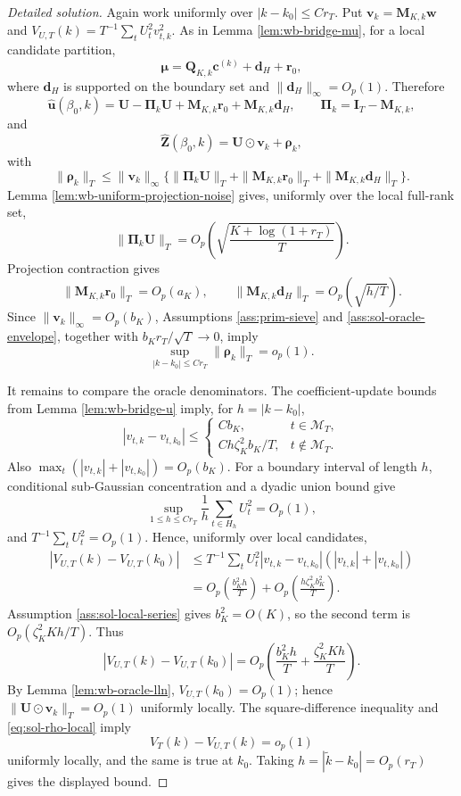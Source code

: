 \documentclass[12pt]{article}
\numberwithin{equation}{section}
\theoremstyle{definition}
\begin{document}
\begin{proof}[Detailed solution]
Again work uniformly over \(|k-k_0|\leq Cr_T\).  Put
\(\bm v_k=\bm M_{K,k}\bm w\) and
\(V_{U,T}(k)=T^{-1}\sum_tU_t^2v_{t,k}^2\).  As in Lemma
\ref{lem:wb-bridge-mu}, for a local candidate partition,
\[
    \bm\mu=\bm Q_{K,k}\bm c^{(k)}+\bm d_H+\bm r_0,
\]
where \(\bm d_H\) is supported on the boundary set and
\(\|\bm d_H\|_\infty=O_p(1)\).  Therefore
\[
    \widehat{\bm u}(\beta_0,k)
    =\bm U-\bm\Pi_k\bm U+\bm M_{K,k}\bm r_0+\bm M_{K,k}\bm d_H,
    \qquad \bm\Pi_k=\bm I_T-\bm M_{K,k},
\]
and
\[
    \widehat{\bm Z}(\beta_0,k)
    =\bm U\odot\bm v_k+\bm\rho_k,
\]
with
\[
    \|\bm\rho_k\|_T
    \leq \|\bm v_k\|_\infty
       \{\|\bm\Pi_k\bm U\|_T
        +\|\bm M_{K,k}\bm r_0\|_T
        +\|\bm M_{K,k}\bm d_H\|_T\}.
\]
Lemma \ref{lem:wb-uniform-projection-noise} gives, uniformly over the local
full-rank set,
\[
    \|\bm\Pi_k\bm U\|_T
    =O_p\left(\sqrt{\frac{K+\log(1+r_T)}{T}}\right).
\]
Projection contraction
gives
\[
    \|\bm M_{K,k}\bm r_0\|_T=O_p(a_K),
    \qquad
    \|\bm M_{K,k}\bm d_H\|_T=O_p(\sqrt{h/T}).
\]
Since \(\|\bm v_k\|_\infty=O_p(b_K)\), Assumptions
\ref{ass:prim-sieve} and \ref{ass:sol-oracle-envelope}, together with
\(b_Kr_T/\sqrt T\to0\), imply
\begin{equation}
    \sup_{|k-k_0|\leq Cr_T}\|\bm\rho_k\|_T=o_p(1).
    \label{eq:sol-rho-local}
\end{equation}

It remains to compare the oracle denominators.  The coefficient-update bounds
from Lemma \ref{lem:wb-bridge-u} imply, for \(h=|k-k_0|\),
\[
    |v_{t,k}-v_{t,k_0}|
    \leq
    \begin{cases}
      Cb_K, & t\in\mathcal M_T,\\[1mm]
      C h\zeta_K^2b_K/T, & t\notin\mathcal M_T.
    \end{cases}
\]
Also \(\max_t(|v_{t,k}|+|v_{t,k_0}|)=O_p(b_K)\).  For a boundary interval
of length \(h\), conditional sub-Gaussian concentration and a dyadic union
bound give
\[
    \sup_{1\leq h\leq Cr_T}\frac{1}{h}\sum_{t\in H_h}U_t^2=O_p(1),
\]
and \(T^{-1}\sum_tU_t^2=O_p(1)\).  Hence, uniformly over local candidates,
\begin{align*}
    |V_{U,T}(k)-V_{U,T}(k_0)|
    &\leq T^{-1}\sum_tU_t^2
      |v_{t,k}-v_{t,k_0}|(|v_{t,k}|+|v_{t,k_0}|)\\
    &=O_p\left(\frac{b_K^2h}{T}\right)
      +O_p\left(\frac{h\zeta_K^2b_K^2}{T}\right).
\end{align*}
Assumption \ref{ass:sol-local-series} gives \(b_K^2=O(K)\), so the second
term is \(O_p(\zeta_K^2Kh/T)\).  Thus
\[
    |V_{U,T}(k)-V_{U,T}(k_0)|
    =O_p\left(\frac{b_K^2h}{T}+\frac{\zeta_K^2Kh}{T}\right).
\]
By Lemma \ref{lem:wb-oracle-lln}, \(V_{U,T}(k_0)=O_p(1)\); hence
\(\|\bm U\odot\bm v_k\|_T=O_p(1)\) uniformly locally.  The
square-difference inequality and \eqref{eq:sol-rho-local} imply
\[
    V_T(k)-V_{U,T}(k)=o_p(1)
\]
uniformly locally, and the same is true at \(k_0\).  Taking
\(h=|\widetilde k-k_0|=O_p(r_T)\) gives the displayed bound.
\end{proof}
\end{document}
